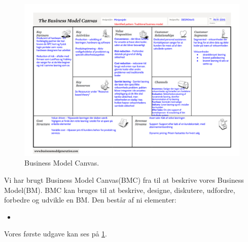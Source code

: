\begin{figure}
  \includegraphics[angle=90, height=0.95\textheight]{graphics/BM.pdf}
  \caption{Business Model Canvas.}
  \label{bm}
\end{figure}

Vi har brugt Business Model Canvas(BMC) fra \citet{osterwalder2009business} til at beskrive vores Business Model(BM).
BMC kan bruges til at beskrive, designe, diskutere, udfordre, forbedre og udvikle en BM.
Den består af ni elementer:
\begin{itemize}
\item 
\end{itemize}
Vores første udgave kan ses på \cref{bm}.
